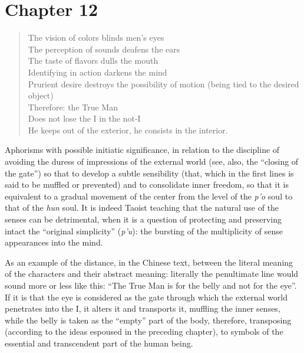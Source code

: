\section{Chapter 12}

\begin{verse}
The vision of colors blinds men's eyes\\
The perception of sounds deafens the ears\\
The taste of flavors dulls the mouth\\
Identifying in action darkens the mind\\
Prurient desire destroys the possibility of motion (being tied to the desired object)\\
Therefore: the True Man\\
Does not lose the I in the not-I\\
He keeps out of the exterior, he consists in the interior.
\end{verse}


Aphorisms with possible initiatic significance, in relation to the discipline of avoiding the duress of impressions of the external world (see, also, the ``closing of the gate'') so that to develop a subtle sensibility (that, which in the first lines is said to be muffled or prevented) and to consolidate inner freedom, so that it is equivalent to a gradual movement of the center from the level of the \emph{p'o} soul to that of the \emph{hun} soul. It is indeed Taoist teaching that the natural use of the senses can be detrimental, when it is a question of protecting and preserving intact the ``original simplicity'' (\emph{p'u}): the bursting of the multiplicity of sense appearances into the mind.

As an example of the distance, in the Chinese text, between the literal meaning of the characters and their abstract meaning: literally the penultimate line would sound more or less like this: ``The True Man is for the belly and not for the eye''. If it is that the eye is considered as the gate through which the external world penetrates into the I, it alters it and transports it, muffling the inner senses, while the belly is taken as the ``empty'' part of the body, therefore, transposing (according to the ideas espoused in the preceding chapter), to symbols of the essential and transcendent part of the human being.

